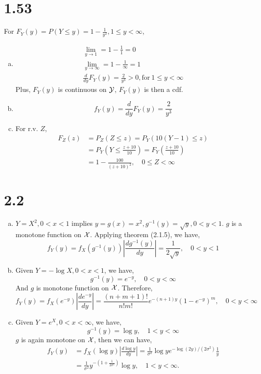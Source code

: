\documentclass[letter]{article}
\newcommand{\cX}{\cal{X}}
\newcommand{\cY}{\cal{Y}}
\begin{document}
    \section*{1.53}
    For $F_Y(y) = P(Y \leq y) = 1-\frac{1}{y^2}, 1 \leq y < \infty$,
    \begin{enumerate}[(a)]
    \item
    \begin{eqnarray*}
    \lim_{y \to 1} = 1 - \frac{1}{1} = 0 \\
    \lim_{y \to \infty} = 1 - \frac{1}{\infty} = 1 \\
    \frac{d}{dy} F_Y(y) = \frac{2}{y^3} > 0, \text{for}~1 \leq y < \infty
    \end{eqnarray*}
    Plus, $F_Y(y)$ is continuous on $\cY$, $F_Y(y)$ is then a cdf.
    \item 
    \[
    f_Y(y) = \frac{d}{dy} F_Y(y) = \frac{2}{y^3}
    \]
    \item For r.v. $Z$,
    \begin{align*}
    F_Z(z) & = P_Z(Z \leq z) = P_Y\left(10(Y-1) \leq z\right) \\
    & = P_Y \left(Y \leq \frac{z + 10}{10}\right) = F_Y(\frac{z+10}{10}) \\
    & = 1 - \frac{100}{(z+10)^2}, \quad 0 \leq Z < \infty
    \end{align*}
    \end{enumerate}

    \section*{2.2}
    \begin{enumerate}[(a)]
    \item $Y = X^2, 0 < x < 1$ implies 
    $y=g(x) = x^2, g^{-1}(y) = \sqrt{y}, 0 < y < 1$. $g$ is a monotone function
    on $\cX$. Applying theorem (2.1.5), we have,
    \[
    f_Y(y) = f_X(g^{-1}(y)) \left| \frac{d g^{-1}(y)}{dy} \right| 
    = \frac{1}{2\sqrt{y}}, \quad 0 < y < 1
    \]
    \item Given $Y = -\log X, 0 < x < 1$, we have,
    \[ g^{-1}(y) = e^{-y}, \quad 0 < y < \infty \]
    And $g$ is monotone function on $\cX$.
    Therefore, 
    \[
    f_Y(y) = f_X(e^{-y}) \left| \frac{d e^{-y}}{dy} \right |
    = \frac{(n+m+1)!}{n!m!} e^{-(n+1)y} (1-e^{-y})^m, \quad 0 < y < \infty
    \]
    
    \item Given $Y = e^X, 0 < x < \infty$, we have,
    \[ g^{-1}(y) = \log y, \quad 1 < y < \infty \]
    $g$ is again monotone on $\cX$, then we can have,
    \begin{align*}
    f_Y(y) & = f_X(\log y) \left| \frac{d \log y}{dy} \right |
    = \frac{1}{\sigma^2} \log y e^{-\log (2y)/(2\sigma^2)} \frac{1}{y} \\
    & = \frac{1}{\sigma^2} y^{-(1+\frac{1}{2 \sigma^2})} \log y, \quad 1 < y <
    \infty.
    \end{align*}
    \end{enumerate}
\end{document}
